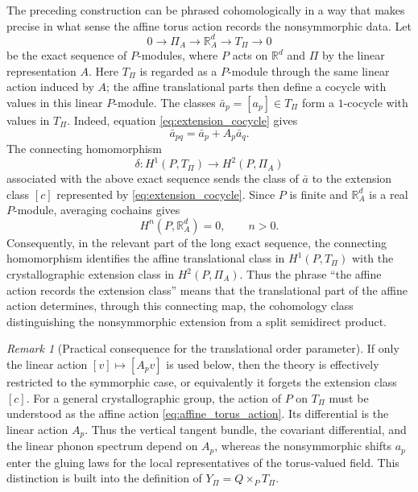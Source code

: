 \documentclass[11pt]{amsart}
\theoremstyle{plain}
\theoremstyle{definition}
\theoremstyle{remark}
\newtheorem{remark}[proposition]{Remark}
\begin{document}
\medskip

The preceding construction can be phrased cohomologically in a way that makes precise in what sense the affine torus action records the nonsymmorphic data. 
Let
\[
0\longrightarrow \Pi_A \longrightarrow \mathbb R^d_A \longrightarrow T_\Pi \longrightarrow 0
\]
be the exact sequence of \(P\)-modules, where \(P\) acts on \(\mathbb R^d\) and \(\Pi\) by the linear representation \(A\). Here \(T_\Pi\) is regarded as a \(P\)-module through the same linear action induced by \(A\); the affine translational parts then define a cocycle with values in this linear \(P\)-module.
The classes \(\bar a_p=[a_p]\in T_\Pi\) form a \(1\)-cocycle with values in \(T_\Pi\). 
Indeed, equation \eqref{eq:extension_cocycle} gives
\[
\bar a_{pq}=\bar a_p+A_p\bar a_q.
\]
The connecting homomorphism
\[
\delta:H^1(P,T_\Pi)\longrightarrow H^2(P,\Pi_A)
\]
associated with the above exact sequence sends the class of \(\bar a\) to the extension class \([c]\) represented by \eqref{eq:extension_cocycle}. 
Since \(P\) is finite and \(\mathbb R^d_A\) is a real \(P\)-module, averaging cochains gives
\[
H^n(P,\mathbb R^d_A)=0,
\qquad n>0.
\]
Consequently, in the relevant part of the long exact sequence, the connecting homomorphism identifies the affine translational class in \(H^1(P,T_\Pi)\) with the crystallographic extension class in \(H^2(P,\Pi_A)\). 
Thus the phrase ``the affine action records the extension class'' means that the translational part of the affine action determines, through this connecting map, the cohomology class distinguishing the nonsymmorphic extension from a split semidirect product.

\begin{remark}[Practical consequence for the translational order parameter]
	\label{rem:nonsymmorphic_affine_action}
	If only the linear action \([v]\mapsto[A_pv]\) is used below, then the theory is effectively restricted to the symmorphic case, or equivalently it forgets the extension class \([c]\). 
	For a general crystallographic group, the action of \(P\) on \(T_\Pi\) must be understood as the affine action \eqref{eq:affine_torus_action}. 
	Its differential is the linear action \(A_p\). 
	Thus the vertical tangent bundle, the covariant differential, and the linear phonon spectrum depend on \(A_p\), whereas the nonsymmorphic shifts \(a_p\) enter the gluing laws for the local representatives of the torus-valued field. 
	This distinction is built into the definition of \(Y_\Pi=Q\times_P T_\Pi\).
\end{remark}
\end{document}
